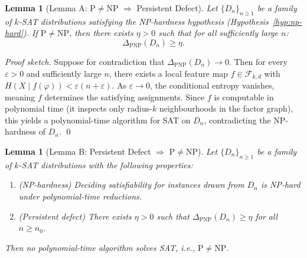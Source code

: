 \documentclass[11pt]{article}
\newtheorem{lemma}[theorem]{Lemma}
\theoremstyle{definition}
\theoremstyle{remark}
\begin{document}

\begin{lemma}[Lemma A: $\mathrm{P} \neq \mathrm{NP}$ $\Rightarrow$ Persistent Defect]
\label{lem:pnp-A}
Let $\{D_n\}_{n \geq 1}$ be a family of $k$-SAT distributions satisfying the NP-hardness hypothesis (Hypothesis~\ref{hyp:np-hard}). If $\mathrm{P} \neq \mathrm{NP}$, then there exists $\eta > 0$ such that for all sufficiently large $n$:
\[
  \Delta_{\mathrm{PNP}}(D_n) \geq \eta.
\]
\end{lemma}

\begin{proof}[Proof sketch]
Suppose for contradiction that $\Delta_{\mathrm{PNP}}(D_n) \to 0$. Then for every $\varepsilon > 0$ and sufficiently large $n$, there exists a local feature map $f \in \mathcal{F}_{k,d}$ with $H(X \mid f(\varphi)) < \varepsilon(n + \varepsilon)$. As $\varepsilon \to 0$, the conditional entropy vanishes, meaning $f$ determines the satisfying assignments. Since $f$ is computable in polynomial time (it inspects only radius-$k$ neighbourhoods in the factor graph), this yields a polynomial-time algorithm for SAT on $D_n$, contradicting the NP-hardness of $D_n$. \qed
\end{proof}

\begin{lemma}[Lemma B: Persistent Defect $\Rightarrow$ $\mathrm{P} \neq \mathrm{NP}$]
\label{lem:pnp-B}
Let $\{D_n\}_{n \geq 1}$ be a family of $k$-SAT distributions with the following properties:
\begin{enumerate}
  \item[(i)] \emph{(NP-hardness)} Deciding satisfiability for instances drawn from $D_n$ is NP-hard under polynomial-time reductions.
  \item[(ii)] \emph{(Persistent defect)} There exists $\eta > 0$ such that $\Delta_{\mathrm{PNP}}(D_n) \geq \eta$ for all $n \geq n_0$.
\end{enumerate}
Then no polynomial-time algorithm solves SAT, i.e., $\mathrm{P} \neq \mathrm{NP}$.
\end{lemma}
\end{document}
